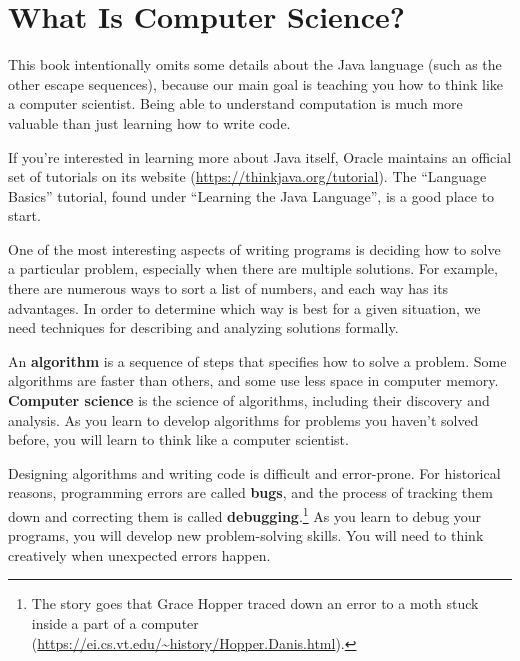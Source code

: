 \section{What Is Computer Science?}

This book intentionally omits some details about the Java language (such as the other escape sequences), because our main goal is teaching you how to think like a computer scientist.
Being able to understand computation is much more valuable than just learning how to write code.

If you're interested in learning more about Java itself, Oracle maintains an official set of tutorials on its website (\url{https://thinkjava.org/tutorial}).
The ``Language Basics'' tutorial, found under ``Learning the Java Language'', is a good place to start.

One of the most interesting aspects of writing programs is deciding how to solve a particular problem, especially when there are multiple solutions.
For example, there are numerous ways to sort a list of numbers, and each way has its advantages.
In order to determine which way is best for a given situation, we need techniques for describing and analyzing solutions formally.


An {\bf algorithm} is a sequence of steps that specifies how to solve a problem.
Some algorithms are faster than others, and some use less space in computer memory.
{\bf Computer science} is the science of algorithms, including their discovery and analysis.
As you learn to develop algorithms for problems you haven't solved before, you will learn to think like a computer scientist.


Designing algorithms and writing code is difficult and error-prone.
For historical reasons, programming errors are called {\bf bugs}, and the process of tracking them down and correcting them is called {\bf debugging}.\footnote{The story goes that Grace Hopper traced down an error to a moth stuck inside a part of a computer (\url{https://ei.cs.vt.edu/~history/Hopper.Danis.html}).}
As you learn to debug your programs, you will develop new problem-solving skills.
You will need to think creatively when unexpected errors happen.


